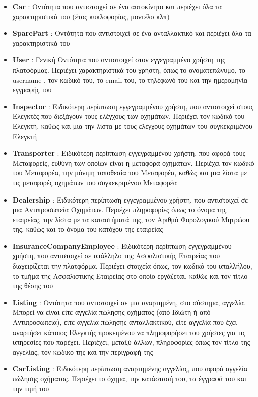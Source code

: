 \documentclass{../ol-softwaremanual}
\begin{document}
	\begin{itemize}
		\item \en \textbf{Car} \gr : Οντότητα που αντιστοιχεί σε ένα αυτοκίνητο και περιέχει όλα τα χαρακτηριστικά του (έτος κυκλοφορίας, μοντέλο κλπ)		
		\item \en \textbf{SparePart} \gr : Οντότητα που αντιστοιχεί σε ένα ανταλλακτικό και περιέχει όλα τα χαρακτηριστικά του
		\item \en \textbf{User} \gr : Γενική Οντότητα που αντιστοιχεί στον εγγεγραμμένο χρήστη της πλατφόρμας. Περιέχει χαρακτηριστικά του χρήστη, όπως το ονοματεπώνυμο, το \en username \gr, τον κωδικό του, το \en email \gr του, το τηλέφωνό του και την ημερομηνία εγγραφής του
		\item \en \textbf{Inspector} \gr : Ειδικότερη περίπτωση εγγεγραμμένου χρήστη, που αντιστοιχεί στους Ελεγκτές που διεξάγουν τους ελέγχους των οχημάτων. Περιέχει τον κωδικό του Ελεγκτή, καθώς και μια την λίστα με τους ελέγχους οχημάτων του συγκεκριμένου Ελεγκτή
		\item \en \textbf{Transporter} \gr : Ειδικότερη περίπτωση εγγεγραμμένου χρήστη, που αφορά τους Μεταφορείς, ευθύνη των οποίων είναι η μεταφορά οχημάτων. Περιέχει τον κωδικό του Μεταφορέα, την μόνιμη τοποθεσία του Μεταφορέα, καθώς και μια λίστα με τις μεταφορές οχημάτων του συγκεκριμένου Μεταφορέα
		\item \en \textbf{Dealership} \gr : Ειδικότερη περίπτωση εγγεγραμμένου χρήστη, που αντιστοιχεί σε μια Αντιπροσωπεία Οχημάτων. Περιέχει πληροφορίες όπως το όνομα της εταιρείας, την λίστα με τα καταστήματά της, τον Αριθμό Φορολογικού Μητρώου της, καθώς και το όνομα του κατόχου της εταιρείας
		\item \en \textbf{InsuranceCompanyEmployee} \gr : Ειδικότερη περίπτωση εγγεγραμμένου χρήστη, που αντιστοιχεί σε υπάλληλο της Ασφαλιστικής Εταιρείας που διαχειρίζεται την πλατφόρμα. Περιέχει στοιχεία όπως, τον κωδικό του υπαλλήλου, το τμήμα της Ασφαλιστικής Εταιρείας στο οποίο εργάζεται, καθώς και τον τίτλο της θέσης του
		\item \en \textbf{Listing} \gr : Οντότητα που αντιστοιχεί σε μια αναρτημένη, στο σύστημα, αγγελία. Μπορεί να είναι είτε αγγελία πώλησης οχήματος (από Ιδιώτη ή από Αντιπροσωπεία), είτε αγγελία πώλησης ανταλλακτικού, είτε αγγελία που έχει αναρτήσει κάποιος Ελεγκτής προκειμένου να πληροφορήσει του χρήστες για τις υπηρεσίες που παρέχει. Περιέχει, μεταξύ άλλων, πληροφορίες όπως τον τίτλο της αγγελίας, τον κωδικό της και την περιγραφή της
		\item \en \textbf{CarListing} \gr : Ειδικότερη περίπτωση αναρτημένης αγγελίας, που αφορά αγγελία πώλησης οχήματος. Περιέχει το όχημα, την κατάστασή του, τα έγγραφά του και την τιμή του

\end{itemize}
\end{document}

